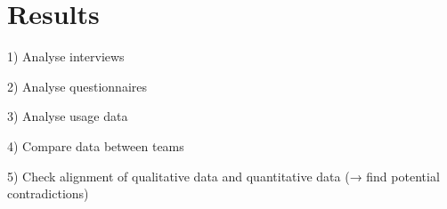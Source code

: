 \chapter{Results}

1) Analyse interviews

2) Analyse questionnaires

3) Analyse usage data

4) Compare data between teams

5) Check alignment of qualitative data and quantitative data (→ find potential contradictions)